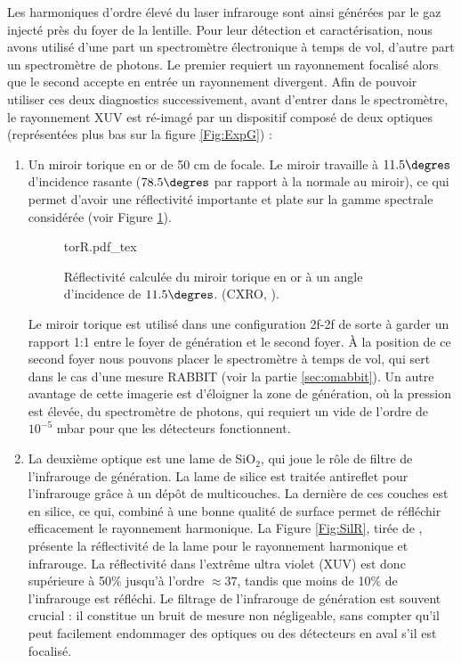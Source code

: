 Les harmoniques d'ordre élevé du laser infrarouge sont ainsi générées par le gaz injecté près du foyer de la lentille. Pour leur détection et caractérisation, nous avons utilisé d'une part un spectromètre électronique à temps de vol, d'autre part un spectromètre de photons. Le premier requiert un rayonnement focalisé alors que le second accepte en entrée un rayonnement divergent. Afin de pouvoir utiliser ces deux diagnostics successivement, avant d'entrer dans le spectromètre, le rayonnement XUV est ré-imagé par un dispositif composé de deux optiques (représentées plus bas sur la figure \ref{Fig:ExpG}) :
\begin{enumerate}
\item Un miroir torique en or de 50 cm de focale. Le miroir travaille à $11.5\degres$ d'incidence rasante ($78.5\degres$ par rapport à la normale au miroir), ce qui permet d'avoir une réflectivité importante et plate sur la gamme spectrale considérée (voir Figure \ref{Fig:TorR}).

\begin{figure}[!ht]
\centering
\def\svgwidth{0.6\columnwidth}
{torR.pdf_tex}
\caption{Réflectivité calculée du miroir torique en or à un angle d'incidence de $11.5\degres$. (CXRO, ).}
\label{Fig:TorR}
\end{figure}
Le miroir torique est utilisé dans une configuration 2f-2f de sorte à garder un rapport\shorthandoff{:} 1:1 \shorthandon{:}entre le foyer de génération et le second foyer. \`{A} la position de ce second foyer nous pouvons placer le spectromètre à temps de vol, qui sert dans le cas d'une mesure RABBIT (voir la partie \ref{sec:omabbit}). Un autre avantage de cette imagerie est d'éloigner la zone de génération, où la pression est élevée, du spectromètre de photons, qui requiert un vide de l'ordre de $10^{-5}$ mbar pour que les détecteurs fonctionnent.\\

\item La deuxième optique est une lame de Si$\mbox{O}_{\mbox{2}}$, qui joue le rôle de filtre de l'infrarouge de génération. La lame de silice est traitée antireflet pour l'infrarouge grâce à un dépôt de multicouches. La dernière de ces couches est en silice, ce qui, combiné à une bonne qualité de surface permet de réfléchir efficacement le rayonnement harmonique. La Figure \ref{Fig:SilR}, tirée de , présente la réflectivité de la lame pour le rayonnement harmonique et infrarouge. La réflectivité dans l'extrême ultra violet (XUV) est donc supérieure à 50\% jusqu'à l'ordre $\approx 37$, tandis que moins de 10\% de l'infrarouge est réfléchi. Le filtrage de l'infrarouge de génération est souvent crucial : il constitue un bruit de mesure non négligeable, sans compter qu'il peut facilement endommager des optiques ou des détecteurs en aval s'il est focalisé.


\end{enumerate}
